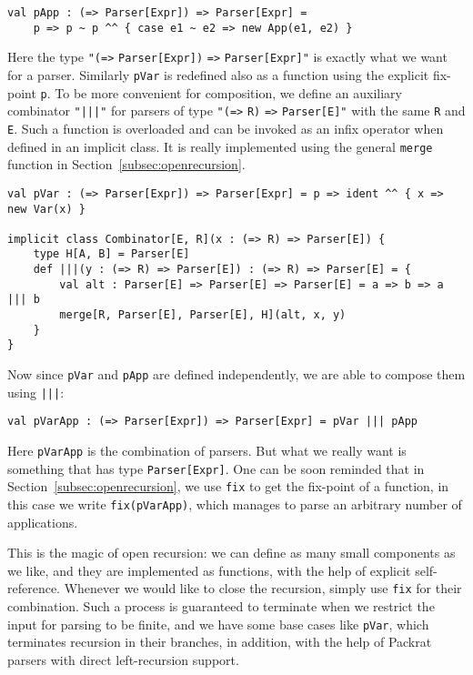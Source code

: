 \begin{lstlisting}
val pApp : (=> Parser[Expr]) => Parser[Expr] =
    p => p ~ p ^^ { case e1 ~ e2 => new App(e1, e2) }
\end{lstlisting}
Here the type \lstinline{"(=>} \lstinline{Parser[Expr])} \lstinline{=>} \lstinline{Parser[Expr]"} is exactly what we want for a parser. Similarly \lstinline{pVar} is redefined also as a function using the explicit fix-point \lstinline{p}. To be more convenient for composition, we define an auxiliary combinator \lstinline{"|||"} for parsers of type \lstinline{"(=>} \lstinline{R)} \lstinline{=>} \lstinline{Parser[E]"} with the same \lstinline{R} and \lstinline{E}. Such a function is overloaded and can be invoked as an infix operator when defined in an implicit class. It is really implemented using the general \lstinline{merge} function in Section~\ref{subsec:openrecursion}.
 \begin{lstlisting}
val pVar : (=> Parser[Expr]) => Parser[Expr] = p => ident ^^ { x => new Var(x) }

implicit class Combinator[E, R](x : (=> R) => Parser[E]) {
    type H[A, B] = Parser[E]
    def |||(y : (=> R) => Parser[E]) : (=> R) => Parser[E] = {
        val alt : Parser[E] => Parser[E] => Parser[E] = a => b => a ||| b
        merge[R, Parser[E], Parser[E], H](alt, x, y)
    }
}
\end{lstlisting}
Now since \lstinline{pVar} and \lstinline{pApp} are defined independently, we are able to compose them using \lstinline{|||}:
\begin{lstlisting}
val pVarApp : (=> Parser[Expr]) => Parser[Expr] = pVar ||| pApp
\end{lstlisting}
Here \lstinline{pVarApp} is the combination of parsers. But what we really want is something that has type \lstinline{Parser[Expr]}. One can be soon reminded that in Section~\ref{subsec:openrecursion}, we use \lstinline{fix} to get the fix-point of a function, in this case we write \lstinline{fix(pVarApp)}, which manages to parse an arbitrary number of applications.

This is the magic of open recursion: we can define as many small components as we like, and they are implemented as functions, with the help of explicit self-reference. Whenever we would like to close the recursion, simply use \lstinline{fix} for their combination. Such a process is guaranteed to terminate when we restrict the input for parsing to be finite, and we have some base cases like \lstinline{pVar}, which terminates recursion in their branches, in addition, with the help of Packrat parsers with direct left-recursion support.

